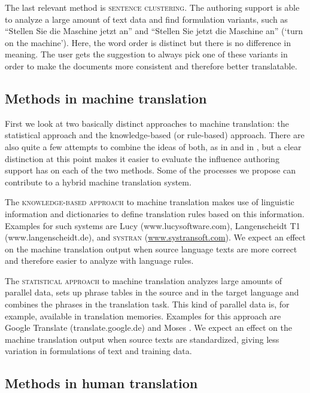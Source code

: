 \documentclass[output=paper]{LSP/langsci}
\begin{document}
The last relevant method is \textsc{sentence clustering}. The authoring support is able to analyze a large amount of text data and find formulation variants, such as ``Stellen Sie die Maschine jetzt an'' and ``Stellen Sie jetzt die Maschine an'' (`turn on the machine'). Here, the word order is distinct but there is no difference in meaning. The user gets the suggestion to always pick one of these variants in order to make the documents more consistent and therefore better translatable.

\subsection{Methods in machine translation}\label{sec:siegel:3.2}

First we look at two basically distinct approaches to machine translation: the statistical approach and the knowledge-based (or rule-based) approach. There are also quite a few attempts to combine the ideas of both, as in \citet{Eisele2009} and in \citet{Thurmair2009}, but a clear distinction at this point makes it easier to evaluate the influence authoring support has on each of the two methods. Some of the processes we propose can contribute to a hybrid machine translation system.

The \textsc{knowledge-based approach} to machine translation makes use of linguistic information and dictionaries to define translation rules based on this information. Examples for such systems are Lucy (www.lucysoftware.com), Langenscheidt T1 (www.langenscheidt.de), and \textsc{systran} (\url{www.systransoft.com}). We expect an effect on the machine translation output when source language texts are more correct and therefore easier to analyze with language rules.

The \textsc{statistical approach} to machine translation analyzes large amounts of parallel data, sets up phrase tables in the source and in the target language and combines the phrases in the translation task. This kind of parallel data is, for example, available in translation memories. Examples for this approach are Google Translate (translate.google.de) and Moses \citep{KoehnEtAl2007}. We expect an effect on the machine translation output when source texts are standardized, giving less variation in formulations of text and training data.

\subsection{Methods in human translation}\label{sec:siegel:3.3}
\end{document}
